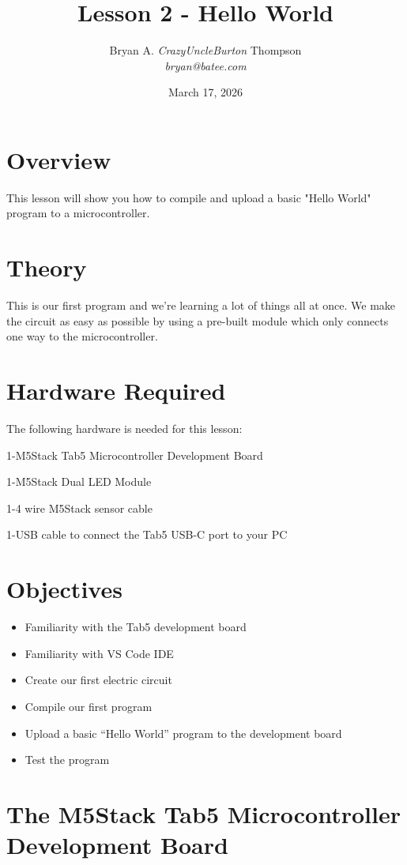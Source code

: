 \documentclass{article}
\title{Lesson 2 - Hello World}
\author{Bryan A. \textit{CrazyUncleBurton} Thompson \\ \textit{bryan@batee.com}}
\date{March 17, 2026}
\begin{document}
\maketitle

\section*{Overview}
This lesson will show you how to compile and upload a basic "Hello World" 
program to a microcontroller.
\vspace{3mm}

\section*{Theory}
This is our first program and we’re learning a lot of things all at once. 
We make the circuit as easy as possible by using a pre-built module which 
only connects one way to the microcontroller.
\vspace{3mm}

\section*{Hardware Required}
The following hardware is needed for this lesson:

1-M5Stack Tab5 Microcontroller Development Board

1-M5Stack Dual LED Module

1-4 wire M5Stack sensor cable 

1-USB cable to connect the Tab5 USB-C port to your PC
\newpage

\section*{Objectives}
\begin{itemize}
  \item Familiarity with the Tab5 development board
  \item Familiarity with VS Code IDE
  \item Create our first electric circuit
  \item Compile our first program
  \item Upload a basic “Hello World” program to the development board
  \item Test the program
\end{itemize}
\newpage


\section*{The M5Stack Tab5 Microcontroller Development Board}
\end{document}
